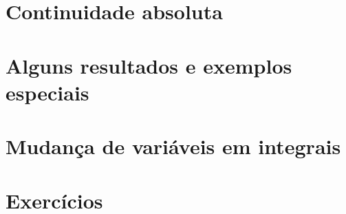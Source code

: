 \documentclass[
]{book}
\begin{document}
\section{Continuidade absoluta}\label{continuidade-absoluta}

\section{Alguns resultados e exemplos especiais}\label{alguns-resultados-e-exemplos-especiais}

\section{Mudança de variáveis em integrais}\label{mudanuxe7a-de-variuxe1veis-em-integrais}

\section*{Exercícios}\label{exercuxedcios-7}
\end{document}
